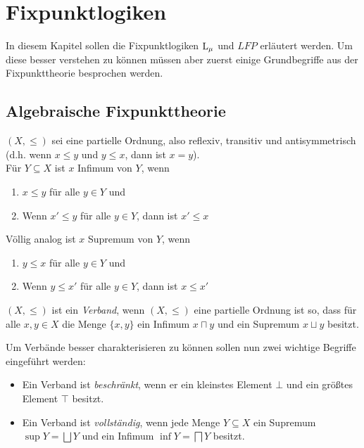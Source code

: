 \clearpage

\section{Fixpunktlogiken}

In diesem Kapitel sollen die Fixpunktlogiken $\operatorname{L}_\mu$ und $LFP$ erläutert werden. 
Um diese besser verstehen zu können müssen aber zuerst einige Grundbegriffe aus der Fixpunkttheorie besprochen werden.

\subsection{Algebraische Fixpunkttheorie}

$(X,\leq)$ sei eine partielle Ordnung, also reflexiv, transitiv und antisymmetrisch (d.h. wenn $x\leq y$ und $y\leq x$, dann ist $x=y$).
\\
Für $Y\subseteq X$ ist $x$ Infimum von $Y$, wenn
\begin{enumerate}
	\item $x\leq y$ für alle $y\in Y$ und
	\item Wenn $x'\leq y$ für alle $y\in Y$, dann ist $x'\leq x$
\end{enumerate}
Völlig analog ist $x$ Supremum von $Y$, wenn
\begin{enumerate}
	\item $y\leq x$ für alle $y\in Y$ und
	\item Wenn $y\leq x'$ für alle $y\in Y$, dann ist $x\leq x '$
\end{enumerate}

\begin{definition}[Verband]
	$(X,\leq)$ ist ein \textit{Verband}, wenn $(X,\leq)$ eine partielle Ordnung ist so, dass für alle $x,y\in X$ die Menge $\{x,y\}$ ein Infimum $x\sqcap y$ und ein Supremum $x\sqcup y$ besitzt.
\end{definition}

\begin{definition}
	Um Verbände besser charakterisieren zu können sollen nun zwei wichtige Begriffe eingeführt werden:
	
	\begin{itemize}
		\item Ein Verband ist \textit{beschränkt}, wenn er ein kleinstes Element $\bot$ und ein größtes Element $\top$ besitzt.
		\item Ein Verband ist \textit{vollständig}, wenn jede Menge $Y\subseteq X$ ein Supremum $\sup Y=\bigsqcup Y$ und ein Infimum $\inf Y = \bigsqcap Y$ besitzt.
	\end{itemize}
\end{definition}

